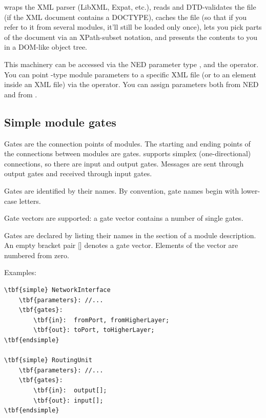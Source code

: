 {\opp} wraps the XML parser (LibXML, Expat, etc.), reads and DTD-validates
the file (if the XML document contains a DOCTYPE), caches the file
(so that if you refer to it from several modules, it'll still be loaded
only once), lets you pick parts of the document via an XPath-subset notation,
and presents the contents to you in a DOM-like object tree.

This machinery can be accessed via the NED parameter type , and the
 operator. You can point -type module parameters
to a specific XML file (or to an element inside an XML file) via the
 operator. You can assign  parameters both from NED
and from .


\subsection{Simple module gates}
\label{sec:ch-ned-lang:simple-module-gates}


Gates are the connection points of modules. The starting and
ending points of the connections between modules are gates. {\opp}
supports simplex (one-directional) connections, so there are
input and output gates. Messages are sent through
output gates and received through input gates.

Gates are identified by their names.
By convention, gate names begin with lower-case letters.

Gate vectors are supported: a gate vector
contains a number of single gates.

Gates are declared by listing their names in the
 section of a module description. An
empty bracket pair [] denotes a gate vector.
Elements of the vector are numbered from zero.

Examples:

\begin{Verbatim}[commandchars=\\\{\}]
\tbf{simple} NetworkInterface
    \tbf{parameters}: //...
    \tbf{gates}:
        \tbf{in}:  fromPort, fromHigherLayer;
        \tbf{out}: toPort, toHigherLayer;
\tbf{endsimple}

\tbf{simple} RoutingUnit
    \tbf{parameters}: //...
    \tbf{gates}:
        \tbf{in}:  output[];
        \tbf{out}: input[];
\tbf{endsimple}
\end{Verbatim}

